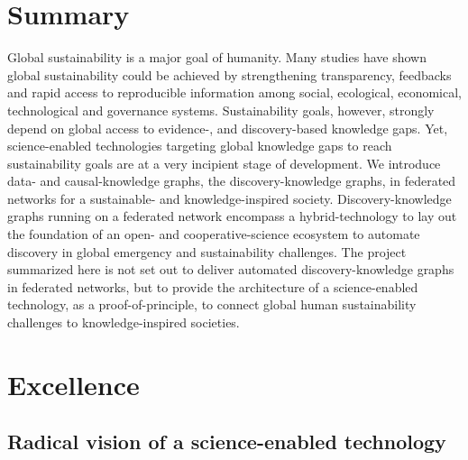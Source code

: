 \documentclass[11pt, a4paper]{article} %
\begin{document}
\section*{{\bf Summary}} Global sustainability is a major goal of
humanity. Many studies have shown global sustainability could be
achieved by strengthening transparency, feedbacks and rapid access to
reproducible information among social, ecological, economical,
technological and governance systems. Sustainability goals, however,
strongly depend on global access to evidence-, and discovery-based
knowledge gaps. Yet, science-enabled technologies targeting global
knowledge gaps to reach sustainability goals are at a very incipient
stage of development. We introduce data- and causal-knowledge graphs,
the discovery-knowledge graphs, in federated networks for a
sustainable- and knowledge-inspired society. Discovery-knowledge
graphs running on a federated network encompass a hybrid-technology to
lay out the foundation of an open- and cooperative-science ecosystem
to automate discovery in global emergency and sustainability
challenges. The project summarized here is not set out to deliver
automated discovery-knowledge graphs in federated networks, but to
provide the architecture of a science-enabled technology, as a
proof-of-principle, to connect global human sustainability challenges
to knowledge-inspired societies.
\section{Excellence}
\subsection{Radical vision of a science-enabled technology}
\end{document}
